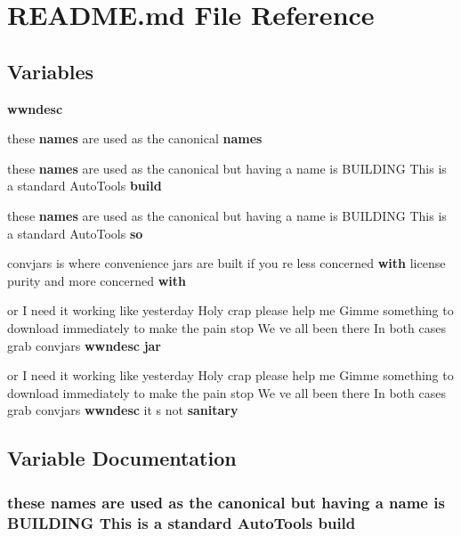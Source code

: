 \section{\-R\-E\-A\-D\-M\-E.\-md \-File \-Reference}
\label{README_8md}
\subsection*{\-Variables}
\begin{DoxyCompactItemize}
\item 
{\bf wwndesc}
\item 
these {\bf names} are used as the \*
canonical {\bf names}
\item 
these {\bf names} are used as the \*
canonical but having a name is \*
\-B\-U\-I\-L\-D\-I\-N\-G \-This is a standard \*
\-Auto\-Tools {\bf build}
\item 
these {\bf names} are used as the \*
canonical but having a name is \*
\-B\-U\-I\-L\-D\-I\-N\-G \-This is a standard \*
\-Auto\-Tools {\bf so}
\item 
convjars is where convenience \*
jars are built if you re less \*
concerned {\bf with} license purity \*
and more concerned {\bf with}
\item 
or \-I need it working like \*
yesterday \-Holy crap please \*
help me \-Gimme something to \*
download immediately to make \*
the pain stop \-We ve all been \*
there \-In both cases grab \*
convjars {\bf wwndesc} {\bf jar}
\item 
or \-I need it working like \*
yesterday \-Holy crap please \*
help me \-Gimme something to \*
download immediately to make \*
the pain stop \-We ve all been \*
there \-In both cases grab \*
convjars {\bf wwndesc} it s not {\bf sanitary}
\end{DoxyCompactItemize}


\subsection{\-Variable \-Documentation}
\subsubsection[{build}]{\setlength{\rightskip}{0pt plus 5cm}these {\bf names} are used as the canonical but having a name is \-B\-U\-I\-L\-D\-I\-N\-G \-This is a standard \-Auto\-Tools {\bf build}}\label{README_8md_a13dda5cfb57ba92f3fcdf5b735c5f533}


